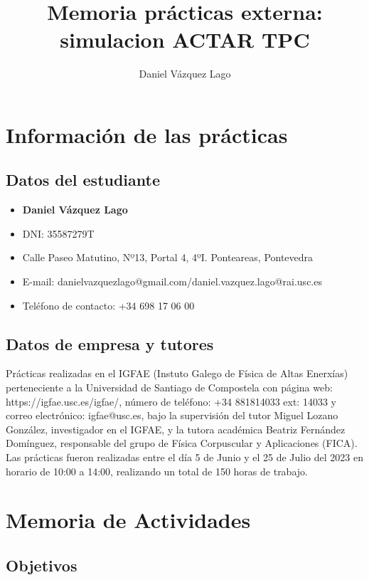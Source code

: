\documentclass[12pt,a4paper]{article}
\title{Memoria prácticas externa: simulacion ACTAR TPC}
\author{Daniel Vázquez Lago}
\numberwithin{equation}{section}
\numberwithin{figure}{section}
\begin{document}





\section{Información de las prácticas}

\subsection{Datos del estudiante}

\begin{itemize}
    \item {\bf Daniel Vázquez Lago}
    \item DNI: 35587279T
    \item Calle Paseo Matutino, Nº13, Portal 4, 4ºI. Ponteareas, Pontevedra 
    \item E-mail: danielvazquezlago@gmail.com/daniel.vazquez.lago@rai.usc.es 
    \item Teléfono de contacto: +34 698 17 06 00
\end{itemize}

\subsection{Datos de empresa y tutores}

Prácticas realizadas en el IGFAE (Instuto Galego de Física de Altas Enerxías) perteneciente a la Universidad de Santiago de Compostela con página web: https://igfae.usc.es/igfae/, número de teléfono: +34 881814033 ext: 14033 y correo electrónico: igfae@usc.es, bajo la supervisión del tutor Miguel Lozano González, investigador en el IGFAE, y la tutora académica Beatriz Fernández Domínguez, responsable del grupo de Física Corpuscular y Aplicaciones (FICA). Las prácticas fueron realizadas entre el día 5 de Junio y el 25 de Julio del 2023 en horario de 10:00 a 14:00, realizando un total de 150 horas de trabajo.

\section{Memoria de Actividades}

\subsection{Objetivos}
\end{document}
